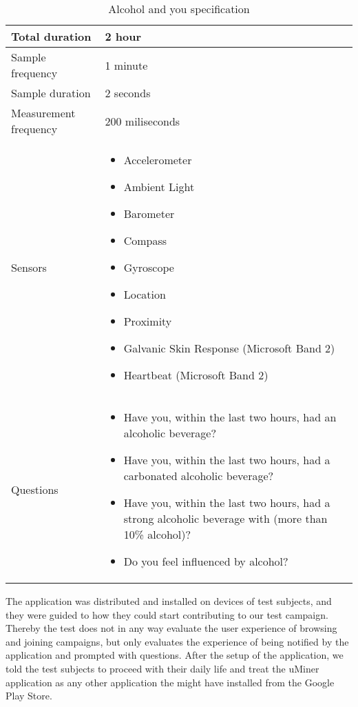 \begin{table}[!htbp]
    \centering
	\begin{tabular}{|m{}|m{}|} \hline
	Total duration        & 2 hour            \\ \hline
	Sample frequency      & 1 minute          \\ \hline
	Sample duration       & 2 seconds         \\ \hline
	Measurement frequency & 200 miliseconds   \\ \hline
	Sensors               & \begin{itemize}[noitemsep]
								\item Accelerometer 
								\item Ambient Light
								\item Barometer
								\item Compass
								\item Gyroscope
								\item Location
								\item Proximity
								\item Galvanic Skin Response (Microsoft Band 2)
								\item Heartbeat (Microsoft Band 2)
							\end{itemize}                \\ \hline
	Questions             & \begin{itemize}[noitemsep]
								\item Have you, within the last two hours, had an alcoholic beverage?
								\item Have you, within the last two hours, had a carbonated alcoholic beverage?
								\item Have you, within the last two hours, had a strong alcoholic beverage with (more than 10\% alcohol)?
								\item Do you feel influenced by alcohol?
							\end{itemize}                \\ \hline
	\end{tabular}
	\caption{Alcohol and you specification}
	\label{tab:test_campaign_spec}
\end{table}
\FloatBarrier

The application was distributed and installed on devices of test subjects, and they were guided to how they could start contributing to our test campaign. Thereby the test does not in any way evaluate the user experience of browsing and joining campaigns, but only evaluates the experience of being notified by the application and prompted with questions. After the setup of the application, we told the test subjects to proceed with their daily life and treat the uMiner application as any other application the might have installed from the Google Play Store. 

